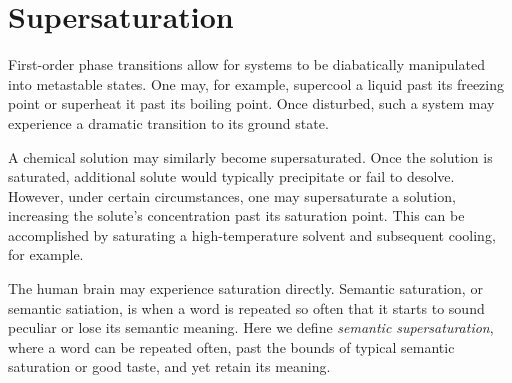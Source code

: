 \section{Supersaturation}

First-order phase transitions allow for systems to be diabatically manipulated into metastable states.
One may, for example, supercool a liquid past its freezing point or superheat it past its boiling point.
Once disturbed, such a system may experience a dramatic transition to its ground state.

A chemical solution may similarly become supersaturated.
Once the solution is saturated, additional solute would typically precipitate or fail to desolve.
However, under certain circumstances, one may supersaturate a solution, increasing the solute's concentration past its saturation point.
This can be accomplished by saturating a high-temperature solvent and subsequent cooling, for example.

The human brain may experience saturation directly.
Semantic saturation, or semantic satiation, is when a word is repeated so often that it starts to sound peculiar or lose its semantic meaning.
Here we define \emph{semantic supersaturation}, where a word can be repeated often, past the bounds of typical semantic saturation or good taste, and yet retain its meaning.

